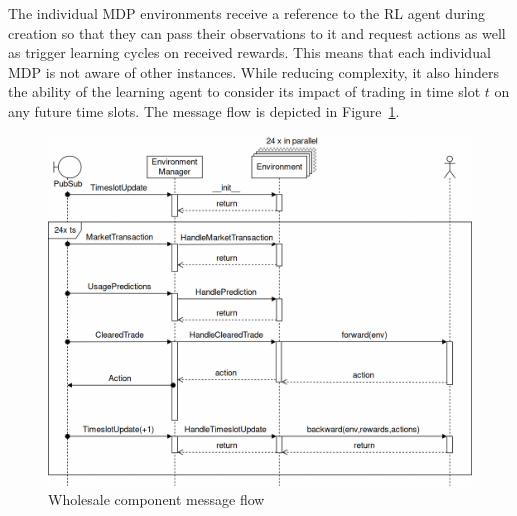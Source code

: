 The individual \ac{MDP} environments receive a reference to the \ac{RL} agent during creation so that they can pass
their observations to it and request actions as well as trigger learning cycles on received rewards. This means that
each individual \ac{MDP} is not aware of other instances. While reducing complexity, it also hinders the ability of
the learning agent to consider its impact of trading in time slot $t$ on any future time slots. The message flow is
depicted in Figure~\ref{fig:ws_msg_flow}.



\begin{figure}[h]
    \centering
    \includegraphics[width=1.0\linewidth]{img/WholesaleComponent.png}
    \caption{Wholesale component message flow}
    \label{fig:ws_msg_flow}
\end{figure}

